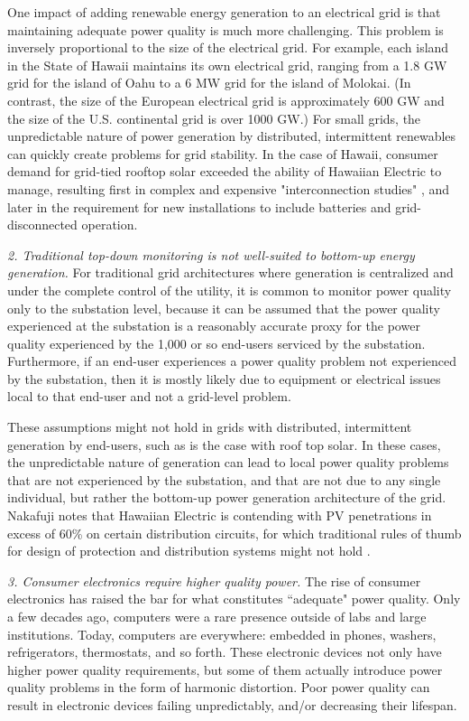 One impact of adding renewable energy generation to an electrical grid is that maintaining adequate power quality is much more challenging. This problem is inversely proportional to the size of the electrical grid. For example, each island in the State of Hawaii maintains its own electrical grid, ranging from a 1.8 GW grid for the island of Oahu to a 6 MW grid for the island of Molokai.  (In contrast, the size of the European electrical grid is approximately 600 GW and the size of the U.S. continental grid is over 1000 GW.) For small grids, the unpredictable nature of power generation by distributed, intermittent renewables can quickly create problems for grid stability. In the case of Hawaii, consumer demand for grid-tied rooftop solar exceeded the ability of Hawaiian Electric to manage, resulting first in complex and expensive "interconnection studies" \cite{trabish_solar_2014,anastasi_energy_2009}, and later in the requirement for new installations to include batteries and grid-disconnected operation.

{\em 2. Traditional top-down monitoring is not well-suited to bottom-up energy generation.} For traditional grid architectures where generation is centralized and under the complete control of the utility, it is common to monitor power quality only to the substation level, because it can be assumed that the power quality experienced at the substation is a reasonably accurate proxy for the power quality experienced by the 1,000 or so end-users serviced by the substation. Furthermore, if an end-user experiences a power quality problem not experienced by the substation, then it is mostly likely due to equipment or electrical issues local to that end-user and not a grid-level problem.

These assumptions might not hold in grids with distributed, intermittent generation by end-users, such as is the case with roof top solar. In these cases, the unpredictable nature of generation can lead to local power quality problems that are not experienced by the substation, and that are not due to any single individual, but rather the bottom-up power generation architecture of the grid. Nakafuji notes that Hawaiian Electric is contending with PV penetrations in excess of 60\% on certain distribution circuits, for which traditional rules of thumb for design of protection and distribution systems might not hold \cite{nakafuji_back--basics_2011}.

{\em 3. Consumer electronics require higher quality power.} The rise of consumer electronics has raised the bar for what constitutes ``adequate" power quality. Only a few decades ago, computers were a rare presence outside of labs and large institutions. Today, computers are everywhere: embedded in phones, washers, refrigerators, thermostats, and so forth. These electronic devices not only have higher power quality requirements, but some of them actually introduce power quality problems in the form of harmonic distortion. Poor power quality can result in electronic devices failing unpredictably, and/or decreasing their lifespan.

